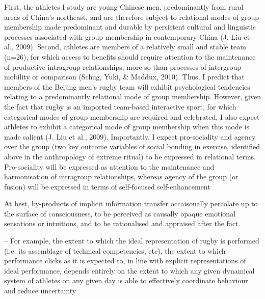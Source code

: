 \documentclass[12pt]{report}
\begin{document}
First, the athletes I study are young Chinese men, predominantly from rural areas of China’s northeast, and are therefore subject to relational modes of group membership made predominant and durable by persistent cultural and linguistic processes associated with group membership in contemporary China (J. Liu et al., 2009).  Second, athletes are members of a relatively small and stable team (n=26), for which access to benefits should require attention to the maintenance of productive intragroup relationships, more so than processes of intergroup mobility or comparison (Schug, Yuki, & Maddux, 2010). Thus, I predict that members of the Beijing men’s rugby team will exhibit psychological tendencies relating to a predominantly relational mode of group membership.  However, given the fact that rugby is an imported team-based interactive sport, for which categorical modes of group membership are required and celebrated, I also expect athletes to exhibit a categorical mode of group membership when this mode is made salient (J. Liu et al., 2009).  Importantly, I expect pro-sociality and agency over the group (two key outcome variables of social bonding in exercise, identified above in the anthropology of extreme ritual) to be expressed in relational terms.  Pro-sociality will be expressed as attention to the maintenance and harmonisation of intragroup relationships, whereas agency of the group (or fusion) will be expressed in terms of self-focused self-enhancement



















At best, by-products of implicit information transfer occaisonally percolate up to the surface of consciousness, to be perceived as causally opaque emotional sensations or intuitions, and to be rationalised and appraised after the fact.

-- For example, the extent to which the ideal representation of rugby is performed (i.e. its assemblage of technical competencies, etc), the extent to which performance clicks as it is expected to, in line with explicit representations of ideal performance, depends entirely on the extent to which any given  dynamical system of athletes on any given day is able to effectively coordinate behaviour and reduce uncertainty
\end{document}
